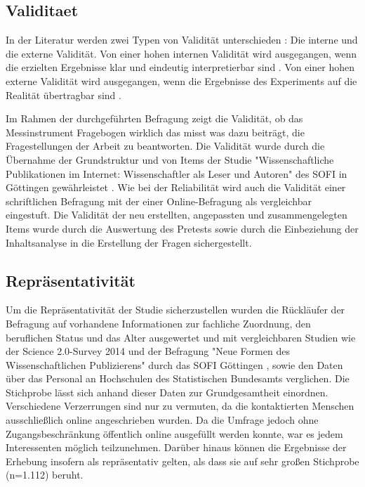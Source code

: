 \subsection{Validitaet}
In der Literatur werden zwei Typen von Validität unterschieden \cite{rost_2004_lehrbuch}: Die interne und die externe Validität. Von einer hohen internen Validität wird ausgegangen, wenn die erzielten Ergebnisse klar und eindeutig interpretierbar sind \cite{raab_2012_fragebogen}. Von einer hohen externe Validität wird ausgegangen, wenn die Ergebnisse des Experiments auf die Realität übertragbar sind \cite{bortz1995forschungsmethoden}.

Im Rahmen der durchgeführten Befragung zeigt die Validität, ob das Messinstrument Fragebogen wirklich das misst was dazu beiträgt, die Fragestellungen der Arbeit zu beantworten. Die Validität wurde durch die Übernahme der Grundstruktur und von Items der Studie "Wissenschaftliche Publikationen im Internet: Wissenschaftler als Leser und Autoren" des SOFI in Göttingen gewährleistet \cite{hanekop_2008}. Wie bei der Reliabilität wird auch die Validität einer schriftlichen Befragung mit der einer Online-Befragung als vergleichbar eingestuft. Die Validität der neu erstellten, angepassten  und zusammengelegten Items wurde durch die Auswertung des Pretests sowie durch die Einbeziehung der Inhaltsanalyse in die Erstellung der Fragen sichergestellt.

\subsection{Repräsentativität}

Um die Repräsentativität der Studie sicherzustellen wurden die Rückläufer der Befragung auf vorhandene Informationen zur fachliche Zuordnung, den beruflichen Status und das Alter ausgewertet und mit vergleichbaren Studien wie der Science 2.0-Survey 2014 \cite{pscheida_2015_science20} und der Befragung "Neue Formen des Wissenschaftlichen Publizierens" durch das SOFI Göttingen \cite{hanekop_2008}, sowie den Daten über das Personal an Hochschulen des Statistischen Bundesamts \cite{destatis_2014} verglichen. Die Stichprobe lässt sich anhand dieser Daten zur Grundgesamtheit einordnen. Verschiedene Verzerrungen sind nur zu vermuten, da die kontaktierten Menschen ausschließlich online angeschrieben wurden. Da die Umfrage jedoch ohne Zugangsbeschränkung öffentlich online ausgefüllt werden konnte, war es jedem Interessenten möglich teilzunehmen. Darüber hinaus können die Ergebnisse der Erhebung insofern als repräsentativ gelten, als dass sie auf sehr großen Stichprobe (n=1.112) beruht.

